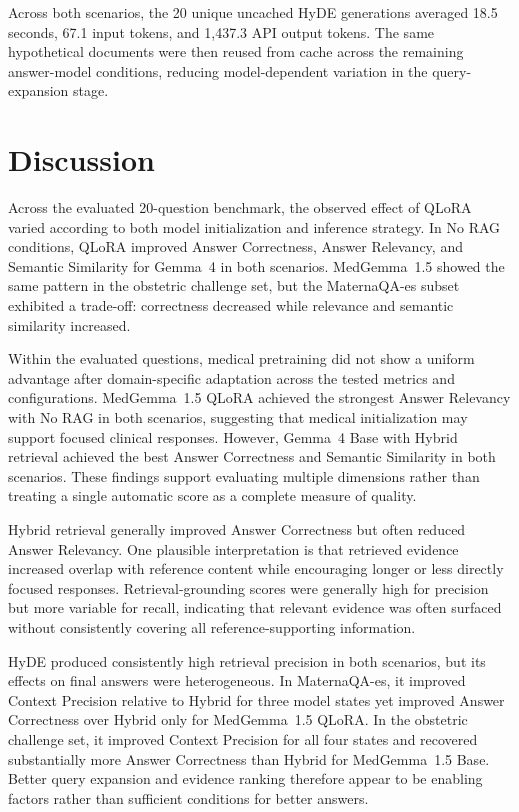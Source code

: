 Across both scenarios, the 20 unique uncached HyDE generations averaged
18.5 seconds, 67.1 input tokens, and 1,437.3 API output tokens. The same
hypothetical documents were then reused from cache across the remaining
answer-model conditions, reducing model-dependent variation in the
query-expansion stage.

\section{Discussion}
Across the evaluated 20-question benchmark, the observed effect of QLoRA
varied according to both model initialization and inference strategy. In
No RAG conditions, QLoRA improved Answer Correctness, Answer
Relevancy, and Semantic Similarity for Gemma~4 in both scenarios.
MedGemma~1.5 showed the same pattern in the obstetric challenge set, but
the MaternaQA-es subset exhibited a trade-off: correctness decreased while
relevance and semantic similarity increased.

Within the evaluated questions, medical pretraining did not show a uniform
advantage after domain-specific adaptation across the tested metrics and
configurations. MedGemma~1.5 QLoRA achieved the strongest Answer Relevancy
with No RAG in both scenarios, suggesting that medical initialization
may support focused clinical responses. However, Gemma~4 Base with Hybrid
retrieval achieved the best Answer Correctness and Semantic Similarity in
both scenarios. These findings support evaluating multiple dimensions
rather than treating a single automatic score as a complete measure of
quality.

Hybrid retrieval generally improved Answer Correctness but often reduced
Answer Relevancy. One plausible interpretation is that retrieved evidence
increased overlap with reference content while encouraging longer or less
directly focused responses. Retrieval-grounding scores were generally high
for precision but more variable for recall, indicating that relevant
evidence was often surfaced without consistently covering all
reference-supporting information.

HyDE produced consistently high retrieval precision in both scenarios, but
its effects on final answers were heterogeneous. In MaternaQA-es, it
improved Context Precision relative to Hybrid for three model states yet
improved Answer Correctness over Hybrid only for MedGemma~1.5 QLoRA. In the
obstetric challenge set, it improved Context Precision for all four states
and recovered substantially more Answer Correctness than Hybrid for
MedGemma~1.5 Base. Better query expansion and evidence ranking therefore
appear to be enabling factors rather than sufficient conditions for better
answers.


